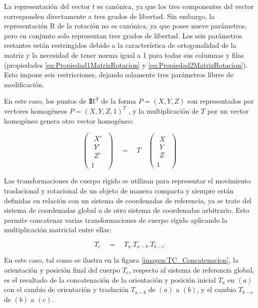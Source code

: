 La representación del vector $t$ es canónica, ya que los tres componentes del vector corresponden directamente
a tres grados de libertad. Sin embargo, la representación R de la rotación no es
canónica, ya que posee nueve parámetros, pero en conjunto solo representan
tres grados de libertad. Los seis parámetros restantes están restringidos debido
a la característica de ortogonalidad de la matriz y la necesidad de tener norma
igual a 1 para todas sus columnas y filas (propiedades \ref{eq:Propiedad1MatrizRotacion} y \ref{eq:Propiedad2MatrizRotacion}). Esto impone seis restricciones, dejando
solamente tres parámetros libres de modificación.

En este caso, los puntos de ${\rm I\!R}^3$ de la forma $P = (X, Y, Z)$  son representados por vectores homogéneos $P = {(X, Y, Z, 1)}^{T}$ , y la multiplicación de $T$ por un vector homogéneo genera otro vector homogéneo:

\begin{equation}
\begin{pmatrix} \begin{matrix} X' \\ Y' \\ Z' \end{matrix} \\ 1 \end{pmatrix}\quad =\quad T\quad \begin{pmatrix} \begin{matrix} X \\ Y \\ Z \end{matrix} \\ 1 \end{pmatrix}
\end{equation}


Las transformaciones de cuerpo rígido se utilizan para representar el movimiento traslacional y rotacional de un objeto de manera compacta y siempre están definidas en relación con un sistema de coordenadas de referencia, ya se trate del sistema de coordenadas global o de otro sistema de coordenadas arbitrario. Esto permite concatenar varias transformaciones de cuerpo rígido aplicando la multiplicación matricial entre ellas:

\begin{equation}
{ T }_{ c }\quad =\quad { T }_{ a }{ .T }_{ a-b }.{ T }_{ b-c }
\end{equation}

En este caso, tal como se ilustra en la figura \ref{imagen:TC_Concatenacion}, la orientación y posición final del cuerpo ${T}_{c}$, respecto al sistema de referencia global, es el resultado de la concatenación de la orientación y posición inicial ${T}_{a}$ en $(a)$ con el cambio de orientación y traslación ${T}_{a-b}$  de $(a)$ a $(b)$, y el cambio ${T}_{b-c}$ de $(b)$ a $(c)$.



